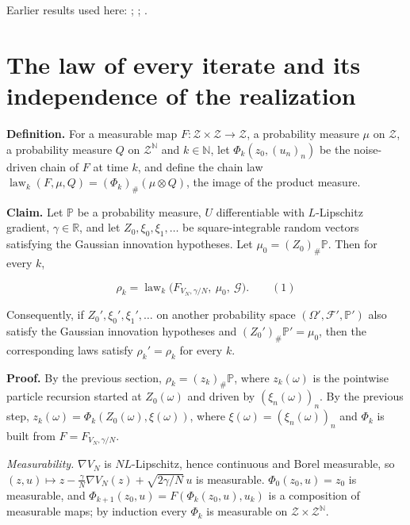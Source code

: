 \documentclass[11pt,a4paper]{article}
\begin{document}
Earlier results used here: \cite[Section~3.20.1]{LangevinLean2026ULASC}; \cite[Section~3.20.3]{LangevinLean2026ULASC}; \cite[Section~3.23.1]{LangevinLean2026ULASC}.

\section{\texorpdfstring{The law of every iterate and its independence of the realization}{The law of every iterate and its independence of the realization}}


\textbf{Definition.} For a measurable map \(F:\mathcal Z\times\mathcal Z\to\mathcal Z\), a probability measure \(\mu\) on \(\mathcal Z\), a probability measure \(Q\) on \(\mathcal Z^{\mathbb N}\) and \(k\in\mathbb N\), let \(\Phi_k(z_0,(u_n)_n)\) be the noise-driven chain of \(F\) at time \(k\), and define the chain law \(\operatorname{law}_k(F,\mu,Q)=(\Phi_k)_\#(\mu\otimes Q)\), the image of the product measure.




\textbf{Claim.} Let \(\mathbb P\) be a probability measure, \(U\) differentiable with \(L\)-Lipschitz gradient, \(\gamma\in\mathbb R\), and let \(Z_0,\xi_0,\xi_1,\dots\) be square-integrable random vectors satisfying the Gaussian innovation hypotheses. Let \(\mu_0=(Z_0)_\#\mathbb P\). Then for every \(k\),


\[\rho_k=\operatorname{law}_k\bigl(F_{V_N,\gamma/N},\ \mu_0,\ \mathcal G\bigr).\qquad(1)\]


Consequently, if \(Z_0',\xi_0',\xi_1',\dots\) on another probability space \((\Omega',\mathcal F',\mathbb P')\) also satisfy the Gaussian innovation hypotheses and \((Z_0')_\#\mathbb P'=\mu_0\), then the corresponding laws satisfy \(\rho_k'=\rho_k\) for every \(k\).




\textbf{Proof.} By the previous section, \(\rho_k=(z_k)_\#\mathbb P\), where \(z_k(\omega)\) is the pointwise particle recursion started at \(Z_0(\omega)\) and driven by \((\xi_n(\omega))_n\). By the previous step, \(z_k(\omega)=\Phi_k(Z_0(\omega),\xi(\omega))\), where \(\xi(\omega)=(\xi_n(\omega))_n\) and \(\Phi_k\) is built from \(F=F_{V_N,\gamma/N}\).




\emph{Measurability.} \(\nabla V_N\) is \(NL\)-Lipschitz, hence continuous and Borel measurable, so \((z,u)\mapsto z-\frac\gamma N\nabla V_N(z)+\sqrt{2\gamma/N}\,u\) is measurable. \(\Phi_0(z_0,u)=z_0\) is measurable, and \(\Phi_{k+1}(z_0,u)=F(\Phi_k(z_0,u),u_k)\) is a composition of measurable maps; by induction every \(\Phi_k\) is measurable on \(\mathcal Z\times\mathcal Z^{\mathbb N}\).
\end{document}
